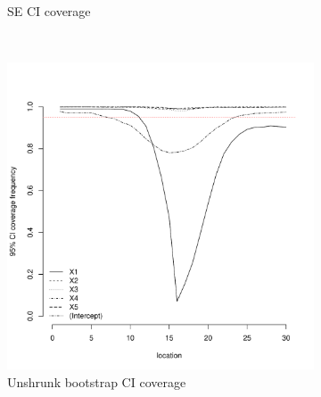 \documentclass[authoryear, review, 11pt]{elsarticle}
\begin{document}
\begin{figure}
\begin{subfigure}[b]{0.45\textwidth}
		\caption{SE CI coverage}
	\end{subfigure}%
	\\%
	\begin{subfigure}[b]{0.45\textwidth}
	\centering
		\includegraphics[width=\textwidth]{../../figures/simulation/15.7.profile_unshrunk_bootstrap_coverage.pdf}
		\caption{Unshrunk bootstrap CI coverage}
	\end{subfigure}%
	~ %
	\begin{subfigure}[b]{0.45\textwidth}
	\centering

\end{subfigure}
\end{figure}
\end{document}
